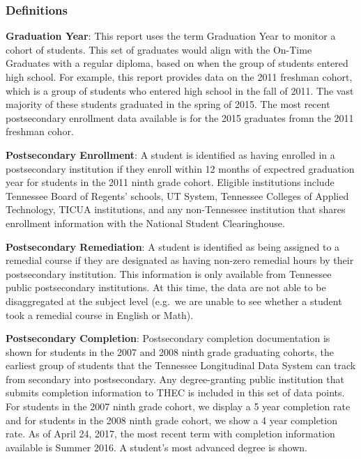 \documentclass[11pt,]{article}
\begin{document}
\newpage 

\newpage  

\subsubsection{Definitions}\label{definitions}

\textbf{Graduation Year}: This report uses the term Graduation Year to
monitor a cohort of students. This set of graduates would align with the
On-Time Graduates with a regular diploma, based on when the group of
students entered high school. For example, this report provides data on
the 2011 freshman cohort, which is a group of students who entered high
school in the fall of 2011. The vast majority of these students
graduated in the spring of 2015. The most recent postsecondary
enrollment data available is for the 2015 graduates fromn the 2011
freshman cohor.

\textbf{Postsecondary Enrollment}: A student is identified as having
enrolled in a postsecondary institution if they enroll within 12 months
of expectred graduation year for students in the 2011 ninth grade
cohort. Eligible institutions include Tennessee Board of Regents'
schools, UT System, Tennessee Colleges of Applied Technology, TICUA
institutions, and any non-Tennessee institution that shares enrollment
information with the National Student Clearinghouse.

\textbf{Postsecondary Remediation}: A student is identified as being
assigned to a remedial course if they are designated as having non-zero
remedial hours by their postsecondary institution. This information is
only available from Tennessee public postsecondary institutions. At this
time, the data are not able to be disaggregated at the subject level
(e.g.~we are unable to see whether a student took a remedial course in
English or Math).

\textbf{Postsecondary Completion}: Postsecondary completion
documentation is shown for students in the 2007 and 2008 ninth grade
graduating cohorts, the earliest group of students that the Tennessee
Longitudinal Data System can track from secondary into postsecondary.
Any degree-granting public institution that submits completion
information to THEC is included in this set of data points. For students
in the 2007 ninth grade cohort, we display a 5 year completion rate and
for students in the 2008 ninth grade cohort, we show a 4 year completion
rate. As of April 24, 2017, the most recent term with completion
information available is Summer 2016. A student's most advanced degree
is shown.
\end{document}
